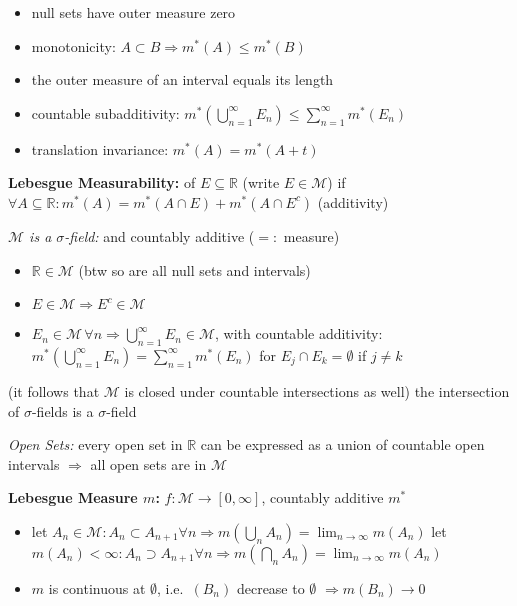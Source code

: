 \documentclass[8pt,twoside]{extarticle}
\begin{document}
\begin{multicols}{2}
\begin{itemize}[itemsep=0em, topsep=0pt, partopsep=0pt,parsep=0pt, leftmargin=1.0em]
\item null sets have outer measure zero
\item monotonicity: $A\subset B \Rightarrow m^*(A)\leq m^*(B)$
\item the outer measure of an interval equals its length
\item countable subadditivity: $m^*\left(\bigcup_{n=1}^\infty E_n\right)\leq \sum_{n=1}^\infty m^*(E_n)$
\item translation invariance: $m^*(A)=m^*(A+t)$
\end{itemize}

\textbf{Lebesgue Measurability:} of $E\subseteq\mathbb{R}$ (write $E\in\mathcal{M}$) if $\forall A\subseteq \mathbb{R}: m^*(A)=m^*(A\cap E)+m^*(A\cap E^c)$ (additivity)

\textit{$\mathcal{M}$ is a $\sigma$-field:} and countably additive ($=:$ measure)

\begin{itemize}[itemsep=0em, topsep=0pt, partopsep=0pt,parsep=0pt, leftmargin=1.0em]
\item $\mathbb{R}\in \mathcal{M}$ (btw so are all null sets and intervals)
\item $E\in\mathcal{M}\Rightarrow E^c\in \mathcal{M}$
\item $E_n{\in} \mathcal{M}\,\forall n \Rightarrow \bigcup_{n=1}^\infty E_n \in \mathcal{M}$, with countable additivity: $m^*(\bigcup_{n=1}^\infty E_n) = \sum_{n=1}^\infty m^*(E_n)$ for $E_j\cap E_k=\emptyset$ if $j\neq k$
\end{itemize}
(it follows that $\mathcal{M}$ is closed under countable intersections as well)
the intersection of $\sigma$-fields is a $\sigma$-field

\textit{Open Sets:} every open set in $\mathbb{R}$ can be expressed as a union of countable open intervals $\Rightarrow$ all open sets are in $\mathcal{M}$

\textbf{Lebesgue Measure $m$:} $f:\mathcal{M}\to [0,\infty]$, countably additive $m^*$




\begin{itemize}[itemsep=0em, topsep=0pt, partopsep=0pt,parsep=0pt, leftmargin=1.0em]
\item let $A_n\in \mathcal{M}: A_n\subset A_{n+1} \forall n \Rightarrow m(\bigcup_n A_n)=\displaystyle\lim_{n\to \infty} m(A_n)$ \newline
\hspace{1em} let $m(A_n)<\infty: A_n\supset A_{n+1} \forall n \Rightarrow m(\bigcap_n A_n)=\displaystyle\lim_{n\to \infty} m(A_n)$
\item $m$ is continuous at $\emptyset$, i.e.\ $(B_n)$ decrease to $\emptyset$ $\Rightarrow m(B_n)\to 0$
\end{itemize}










\end{multicols}
\end{document}
